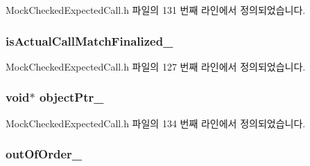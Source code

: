 Mock\+Checked\+Expected\+Call.\+h 파일의 131 번째 라인에서 정의되었습니다.

\subsubsection[{\texorpdfstring{is\+Actual\+Call\+Match\+Finalized\+\_\+}{isActualCallMatchFinalized_}}]{ is\+Actual\+Call\+Match\+Finalized\+\_\+\hspace{0.3cm}{\ttfamily [private]}}\hypertarget{class_mock_checked_expected_call_ac0e1e4489285d1321956007eb75b85a2}{}\label{class_mock_checked_expected_call_ac0e1e4489285d1321956007eb75b85a2}


Mock\+Checked\+Expected\+Call.\+h 파일의 127 번째 라인에서 정의되었습니다.

\subsubsection[{\texorpdfstring{object\+Ptr\+\_\+}{objectPtr_}}]{\setlength{\rightskip}{0pt plus 5cm}void$\ast$ object\+Ptr\+\_\+\hspace{0.3cm}{\ttfamily [private]}}\hypertarget{class_mock_checked_expected_call_aaa34e20272636b954a7c4f8538e3a03a}{}\label{class_mock_checked_expected_call_aaa34e20272636b954a7c4f8538e3a03a}


Mock\+Checked\+Expected\+Call.\+h 파일의 134 번째 라인에서 정의되었습니다.

\subsubsection[{\texorpdfstring{out\+Of\+Order\+\_\+}{outOfOrder_}}]{ out\+Of\+Order\+\_\+\hspace{0.3cm}{\ttfamily [private]}}\hypertarget{class_mock_checked_expected_call_ae029f516e1d03929c5afbf3110a05216}{}\label{class_mock_checked_expected_call_ae029f516e1d03929c5afbf3110a05216}


